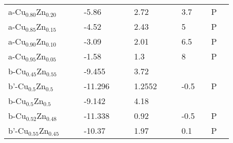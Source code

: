 \begin{landscape}
\begin{center}
\begin{longtable}{|l|p{2.5cm}|l|p{2.5cm}|l|l|p{2.5cm}|l|l|p{2.5cm}|l|l|l|}
a-Cu$_{0.80}$Zn$_{0.20}$   &                            &     & -5.86               &     & \citep{KubaschewskiCatterallJohnAshley.1956}     & 2.72               &     & \citep{KubaschewskiCatterallJohnAshley.1956} & 3.7                                 &     & P   &  \\
a-Cu$_{0.85}$Zn$_{0.15}$   &                            &     & -4.52               &     & \citep{KubaschewskiCatterallJohnAshley.1956}     & 2.43               &     & \citep{KubaschewskiCatterallJohnAshley.1956} & 5                                   &     & P   &  \\
a-Cu$_{0.90}$Zn$_{0.10}$   &                            &     & -3.09               &     & \citep{KubaschewskiCatterallJohnAshley.1956}     & 2.01               &     & \citep{KubaschewskiCatterallJohnAshley.1956} & 6.5                                 &     & P   &  \\
a-Cu$_{0.95}$Zn$_{0.05}$   &                            &     & -1.58               &     & \citep{KubaschewskiCatterallJohnAshley.1956}     & 1.3                &     & \citep{KubaschewskiCatterallJohnAshley.1956} & 8                                   &     & P   &  \\
b-Cu$_{0.45}$Zn$_{0.55}$   &                            &     & -9.455              &     & \citep{KubaschewskiCatterallJohnAshley.1956}     & 3.72               &     & \citep{KubaschewskiCatterallJohnAshley.1956} &                                     &     &     &  \\
b'-Cu$_{0.5}$Zn$_{0.5} $   &                            &     & -11.296             &     & \citep{KubaschewskiCatterallJohnAshley.1956}     & 1.2552             &     & \citep{KubaschewskiCatterallJohnAshley.1956} & -0.5                               &     & P   &  \\
b-Cu$_{0.5}$Zn$_{0.5}$     &                            &     & -9.142              &     & \citep{KubaschewskiCatterallJohnAshley.1956}     & 4.18               &     & \citep{KubaschewskiCatterallJohnAshley.1956} &                                     &     &     &  \\
b-Cu$_{0.52}$Zn$_{0.48}$   &                            &     & -11.338             &     & \citep{KubaschewskiCatterallJohnAshley.1956}     & 0.92               &     & \citep{KubaschewskiCatterallJohnAshley.1956} & -0.5                               &     & P   &  \\
b'-Cu$_{0.55}$Zn$_{0.45}$  &                            &     & -10.37              &     & \citep{KubaschewskiCatterallJohnAshley.1956}     & 1.97               &     & \citep{KubaschewskiCatterallJohnAshley.1956} & 0.1                               &     & P   &  \\

\end{longtable}
\end{center}
\end{landscape}
